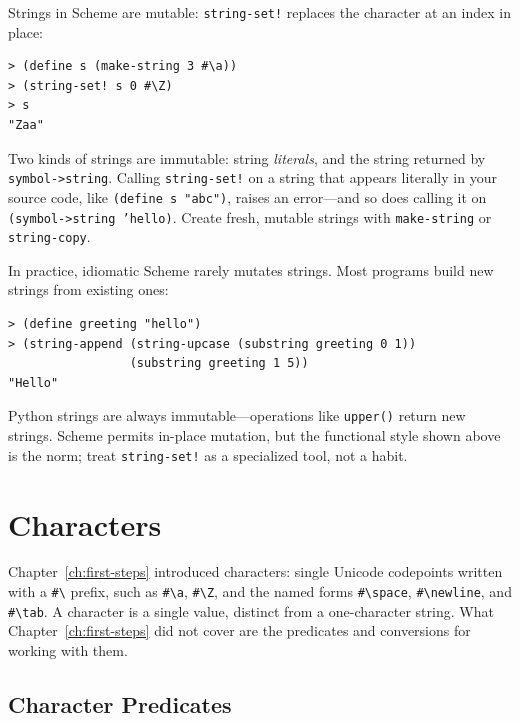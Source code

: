 Strings in Scheme are mutable: \texttt{string-set!} replaces the character at an index in place:

\begin{lstlisting}[style=repl]
> (define s (make-string 3 #\a))
> (string-set! s 0 #\Z)
> s
"Zaa"
\end{lstlisting}

Two kinds of strings are immutable: string \emph{literals}, and the string returned by \texttt{symbol->string}. Calling \texttt{string-set!} on a string that appears literally in your source code, like \texttt{(define s "abc")}, raises an error---and so does calling it on \texttt{(symbol->string 'hello)}. Create fresh, mutable strings with \texttt{make-string} or \texttt{string-copy}.

In practice, idiomatic Scheme rarely mutates strings. Most programs build new strings from existing ones:

\begin{lstlisting}[style=repl]
> (define greeting "hello")
> (string-append (string-upcase (substring greeting 0 1))
                 (substring greeting 1 5))
"Hello"
\end{lstlisting}

\begin{note}
Python strings are always immutable---operations like \texttt{upper()} return new strings. Scheme permits in-place mutation, but the functional style shown above is the norm; treat \texttt{string-set!} as a specialized tool, not a habit.
\end{note}

\section{Characters}

Chapter~\ref{ch:first-steps} introduced characters: single Unicode codepoints written with a \texttt{\#\textbackslash} prefix, such as \texttt{\#\textbackslash a}, \texttt{\#\textbackslash Z}, and the named forms \texttt{\#\textbackslash space}, \texttt{\#\textbackslash newline}, and \texttt{\#\textbackslash tab}. A character is a single value, distinct from a one-character string. What Chapter~\ref{ch:first-steps} did not cover are the predicates and conversions for working with them.

\subsection{Character Predicates}

